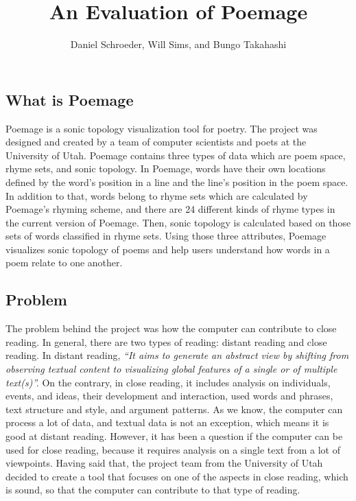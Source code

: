 \documentclass[journal]{vgtc}                %
\title{An Evaluation of Poemage}
\author{Daniel Schroeder, Will Sims, and Bungo Takahashi}
\begin{document}


\maketitle
\subsection{What is Poemage}
Poemage is a sonic topology visualization tool for poetry. The project was designed and created by a team of computer scientists and poets at the University of Utah. Poemage contains three types of data which are poem space, rhyme sets, and sonic topology. In Poemage, words have their own locations defined by the word’s position in a line and the line’s position in the poem space.  In addition to that, words belong to rhyme sets which are calculated by Poemage’s rhyming scheme, and there are 24 different kinds of rhyme types in the current version of Poemage. Then, sonic topology is calculated based on those sets of words classified in rhyme sets. Using those three attributes, Poemage visualizes sonic topology of poems and help users understand how words in a poem relate to one another.
\subsection{Problem}
 The problem behind the project was how the computer can contribute to close reading. In general, there are two types of reading: distant reading and close reading. In distant reading, {\it``It aims to generate an abstract view by shifting from observing textual content to visualizing global features of a single or of multiple text(s)''.} \cite{reading} On the contrary, in close reading, it includes analysis on individuals, events, and ideas, their development and interaction, used words and phrases, text structure and style, and argument patterns. \cite{reading} As we know, the computer can process a lot of data, and textual data is not an exception, which means it is good at distant reading. However, it has been a question if the computer can be used for close reading, because it requires analysis on a single text from a lot of viewpoints. Having said that, the project team from the University of Utah decided to create a tool that focuses on one of the aspects in close reading, which is sound, so that the computer can contribute to that type of reading.
\end{document}
